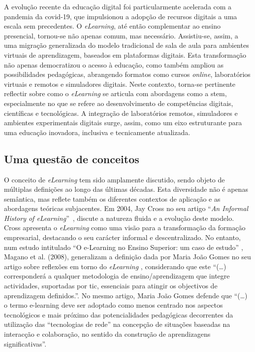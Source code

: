 A evolução recente da educação digital foi particularmente acelerada com a pandemia da \acrshort{covid-19}, que impulsionou a adopção de recursos digitais a uma escala sem precedentes. O \textit{eLearning}, até então complementar ao ensino presencial, tornou-se não apenas comum, mas necessário. Assistiu-se, assim, a uma migração generalizada do modelo tradicional de sala de aula para ambientes virtuais de aprendizagem, baseados em plataformas digitais. Esta transformação não apenas democratizou o acesso à educação, como também ampliou as possibilidades pedagógicas, abrangendo formatos como cursos \textit{online}, laboratórios virtuais e remotos e simuladores digitais. Neste contexto, torna-se pertinente reflectir sobre como o \textit{eLearning} se articula com abordagens como a \acrshort{stem}, especialmente no que se refere ao desenvolvimento de competências digitais, científicas e tecnológicas. A integração de laboratórios remotos, simuladores e ambientes experimentais digitais surge, assim, como um eixo estruturante para uma educação inovadora, inclusiva e tecnicamente 
atualizada.

\subsection{Uma questão de conceitos}
O conceito de \textit{eLearning} tem sido amplamente discutido, sendo objeto de múltiplas definições ao longo das últimas décadas. Esta diversidade não é apenas semântica, mas reflete também os diferentes contextos de aplicação e as abordagens teóricas subjacentes. Em 2004, Jay Cross no seu artigo ``\textit{An Informal History of eLearning}''~\cite{jaycross}, discute a natureza fluida e a evolução deste modelo. Cross apresenta o \textit{eLearning} como uma visão para a transformação da formação empresarial, destacando o seu carácter informal e descentralizado.  No entanto, num estudo intitulado ``O e-Learning no Ensino Superior: um caso de estudo'' \cite{eLearningenssup}, Magano et al. (2008), generalizam a definição dada por Maria João Gomes no seu artigo sobre reflexões em torno do \textit{eLearning} \cite{gomes_e-learning_2005}, considerando que este ``(\ldots) corresponderá a qualquer metodologia de ensino/aprendizagem que integre actividades, suportadas por \acrshort{tic}, essenciais para atingir os objectivos de aprendizagem definidos.''. No mesmo artigo, Maria João Gomes defende que ``(\ldots) o termo e-learning deve ser adoptado como menos centrado nos aspectos tecnológicos e mais próximo das potencialidades pedagógicas decorrentes da utilização das ``tecnologias de rede'' na concepção de situações baseadas na interacção e colaboração, no sentido da construção de aprendizagens significativas''.


